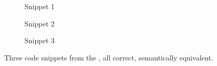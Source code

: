 \begin{figure}[ht!]
    \centering
    
    \begin{subfigure}[t]{0.3\textwidth}
        
        
        \vspace{2.5em} 
        \caption{Snippet 1}
        \label{lst:good1}
    \end{subfigure}
    \hfill
    \begin{subfigure}[t]{0.3\textwidth}
        
        
        \vspace{3.4em}
        \caption{Snippet 2}
        \label{lst:good2}
    \end{subfigure}
    \hfill
    \begin{subfigure}[t]{0.3\textwidth}
        
        
        \vspace{2.5em}
        \caption{Snippet 3}
        \label{lst:good3}
    \end{subfigure}

    \caption{Three code snippets from the \gptturbo, all correct, semantically equivalent.}
    \label{fig:good-llm-snippets}
\end{figure}


